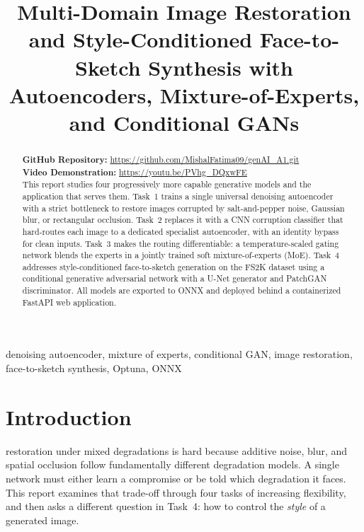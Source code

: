 \documentclass[conference]{IEEEtran}
\begin{document}
\title{Multi-Domain Image Restoration and Style-Conditioned Face-to-Sketch Synthesis with Autoencoders, Mixture-of-Experts, and Conditional GANs}

\author{
}

\maketitle

\begin{abstract}
\textbf{GitHub Repository:} \url{https://github.com/MishalFatima09/genAI_A1.git} \\
\textbf{Video Demonstration:} \url{https://youtu.be/PVhg_DQxwFE} \\

This report studies four progressively more capable generative models and the application that serves them. Task~1 trains a single universal denoising autoencoder with a strict bottleneck to restore images corrupted by salt-and-pepper noise, Gaussian blur, or rectangular occlusion. Task~2 replaces it with a CNN corruption classifier that hard-routes each image to a dedicated specialist autoencoder, with an identity bypass for clean inputs. Task~3 makes the routing differentiable: a temperature-scaled gating network blends the experts in a jointly trained soft mixture-of-experts (MoE). Task~4 addresses style-conditioned face-to-sketch generation on the FS2K dataset using a conditional generative adversarial network with a U-Net generator and PatchGAN discriminator. All models are exported to ONNX and deployed behind a containerized FastAPI web application. 
\end{abstract}

\begin{IEEEkeywords}
denoising autoencoder, mixture of experts, conditional GAN, image restoration, face-to-sketch synthesis, Optuna, ONNX
\end{IEEEkeywords}

\section{Introduction}
 restoration under mixed degradations is hard because additive noise, blur, and spatial occlusion follow fundamentally different degradation models. A single network must either learn a compromise or be told which degradation it faces. This report examines that trade-off through four tasks of increasing flexibility, and then asks a different question in Task~4: how to control the \emph{style} of a generated image.
\end{document}
